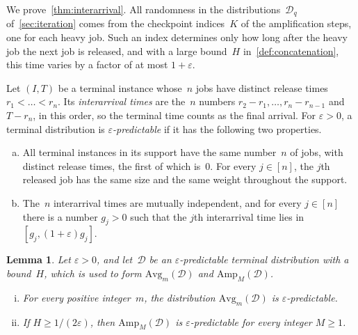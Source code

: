 \documentclass[11pt,letterpaper]{article}
\newtheorem{lemma}[theorem]{Lemma}
\theoremstyle{definition}
\theoremstyle{remark}
\newcommand{\eps}{\varepsilon}
\newcommand{\cD}{\mathcal{D}}
\newcommand{\Amp}{\mathrm{Amp}}
\newcommand{\Avg}{\mathrm{Avg}}
\begin{document}
We prove~\cref{thm:interarrival}. All randomness in the distributions~$\cD_q$ of~\cref{sec:iteration} comes from the checkpoint indices~$K$ of the amplification steps, one for each heavy job. Such an index determines only how long after the heavy job the next job is released, and with a large bound~$H$ in~\cref{def:concatenation}, this time varies by a factor of at most $1+\eps$.

Let $(I,T)$ be a terminal instance whose~$n$ jobs have distinct release times $r_1<\dots<r_n$. Its \emph{interarrival times} are the~$n$ numbers $r_2-r_1,\dots,r_n-r_{n-1}$ and $T-r_n$, in this order, so the terminal time counts as the final arrival. For $\eps>0$, a terminal distribution is \emph{$\eps$-predictable} if it has the following two properties.
\begin{enumerate}[(a)]
\item\label{it:pred-jobs} All terminal instances in its support have the same number~$n$ of jobs, with distinct release times, the first of which is~$0$. For every $j\in[n]$, the $j$th released job has the same size and the same weight throughout the support.
\item\label{it:pred-gaps} The~$n$ interarrival times are mutually independent, and for every $j\in[n]$ there is a number $g_j>0$ such that the $j$th interarrival time lies in $[g_j,(1+\eps)g_j]$.
\end{enumerate}

\begin{lemma}\label{lem:predictable}
Let $\eps>0$, and let~$\cD$ be an $\eps$-predictable terminal distribution with a bound~$H$, which is used to form $\Avg_m(\cD)$ and $\Amp_M(\cD)$.
\begin{enumerate}[(i)]
\item\label{it:pred-avg} For every positive integer~$m$, the distribution $\Avg_m(\cD)$ is $\eps$-predictable.
\item\label{it:pred-amp} If $H\ge1/(2\eps)$, then $\Amp_M(\cD)$ is $\eps$-predictable for every integer $M\ge1$.
\end{enumerate}
\end{lemma}
\end{document}
